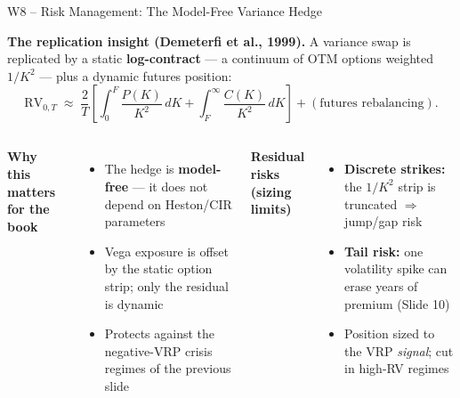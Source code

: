 \documentclass[aspectratio=169, 11pt]{beamer}
\begin{document}
\begin{frame}{W8 -- Risk Management: The Model-Free Variance Hedge}

\textbf{The replication insight (Demeterfi et al., 1999).}\; A variance swap is
replicated by a static \textbf{log-contract} --- a continuum of OTM options weighted
$1/K^2$ --- plus a dynamic futures position:
\[
  \mathrm{RV}_{0,T} \;\approx\; \frac{2}{T}\!\left[\int_0^{F}\!\frac{P(K)}{K^2}\,dK
  + \int_{F}^{\infty}\!\frac{C(K)}{K^2}\,dK\right] + (\text{futures rebalancing}).
\]

\begin{columns}[T]
\textbf{Why this matters for the book}
\begin{itemize}\small
  \item The hedge is \textbf{model-free} --- it does not depend on Heston/CIR parameters
  \item Vega exposure is offset by the static option strip; only the residual is dynamic
  \item Protects against the negative-VRP crisis regimes of the previous slide
\end{itemize}

\textbf{Residual risks (sizing limits)}
\begin{itemize}\small
  \item \textbf{Discrete strikes:} the $1/K^2$ strip is truncated $\Rightarrow$ jump/gap risk
  \item \textbf{Tail risk:} one volatility spike can erase years of premium (Slide 10)
  \item Position sized to the VRP \textit{signal}; cut in high-RV regimes
\end{itemize}
\end{columns}
\end{frame}
\end{document}
